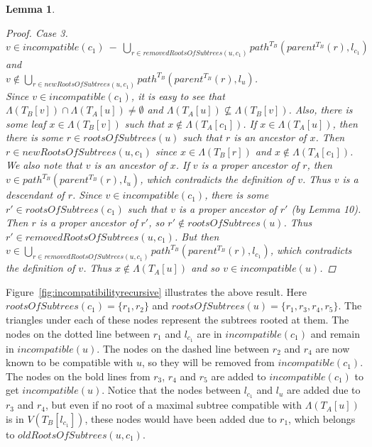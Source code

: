 \documentclass{article}
\newcommand{\leafset}{\Lambda}
\newtheorem{incompatibilityrecursive}[incompatibility]{Lemma}
\begin{document}
\begin{incompatibilityrecursive}
\begin{proof}
            \textit{Case 3.} $v \in incompatible(c_1)\ -\ \bigcup_{r \in removedRootsOfSubtrees(u, c_1)} path^{T_B}(parent^{T_B}(r), l_{c_1})$ and\\[0.25em] %
            $v \not\in \bigcup_{r \in newRootsOfSubtrees(u, c_1)} path^{T_B}(parent^{T_B}(r), l_u)$.\\[0.25em]
            Since $v \in incompatible(c_1)$, it is easy to see that $\leafset(T_B[v]) \cap \leafset(T_A[u]) \neq \emptyset$ and $\leafset(T_A[u]) \not\subseteq \leafset(T_B[v])$. Also, there is some leaf $x \in \leafset(T_B[v])$ such that $x \not\in \leafset(T_A[c_1])$. If $x \in \leafset(T_A[u])$, then there is some $r \in rootsOfSubtrees(u)$ such that $r$ is an ancestor of $x$. Then $r \in newRootsOfSubtrees(u, c_1)$ since $x \in \leafset(T_B[r])$ and $x \not\in \leafset(T_A[c_1])$. We also note that $v$ is an ancestor of $x$. If $v$ is a proper ancestor of $r$, then $v \in path^{T_B}(parent^{T_B}(r), l_u)$, which contradicts the definition of $v$. Thus $v$ is a descendant of $r$. Since $v \in incompatible(c_1)$, there is some $r' \in rootsOfSubtrees(c_1)$ such that $v$ is a proper ancestor of $r'$ (by Lemma 10). Then $r$ is a proper ancestor of $r'$, so $r' \not\in rootsOfSubtrees(u)$. Thus $r' \in removedRootsOfSubtrees(u, c_1)$. But then $v \in \bigcup_{r \in removedRootsOfSubtrees(u, c_1)} path^{T_B}(parent^{T_B}(r), l_{c_1})$, which contradicts the definition of $v$. Thus $x \not\in \leafset(T_A[u])$ and so $v \in incompatible(u)$.
        \end{proof}
    \end{incompatibilityrecursive}

    Figure~\ref{fig:incompatibilityrecursive} illustrates the above result. Here $rootsOfSubtrees(c_1) = \{r_1, r_2\}$ and $rootsOfSubtrees(u) = \{r_1, r_3, r_4, r_5\}$. The triangles under each of these nodes represent the subtrees rooted at them. The nodes on the dotted line between $r_1$ and $l_{c_1}$ are in $incompatible(c_1)$ and remain in $incompatible(u)$. The nodes on the dashed line between $r_2$ and $r_4$ are now known to be compatible with $u$, so they will be removed from $incompatible(c_1)$. The nodes on the bold lines from $r_3$, $r_4$ and $r_5$ are added to $incompatible(c_1)$ to get $incompatible(u)$. Notice that the nodes between $l_{c_1}$ and $l_u$ are added due to $r_3$ and $r_4$, but even if no root of a maximal subtree compatible with $\leafset(T_A[u])$ is in $V(T_B[l_{c_1}])$, these nodes would have been added due to $r_1$, which belongs to $oldRootsOfSubtrees(u, c_1)$.
\end{document}
